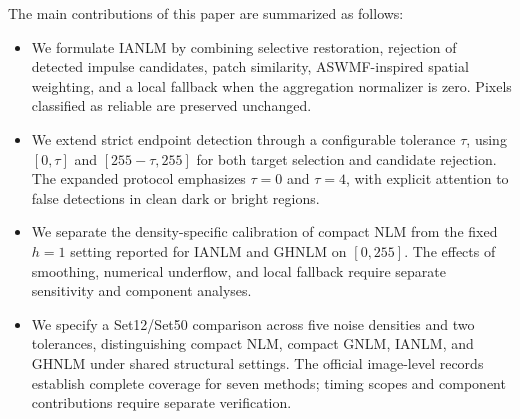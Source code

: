 \documentclass[pdflatex,iicol,sn-mathphys-num]{sn-jnl}
\newif\ifshowportuguese
\newcommand{\pt}[1]{\ifshowportuguese\par\begingroup\small\color{blue!55!black}\noindent\textbf{PT: }#1\par\endgroup\fi}
\begin{document}
The main contributions of this paper are summarized as follows:
\pt{As principais contribuições deste artigo são resumidas a seguir:}
\begin{itemize}
    \item We formulate IANLM by combining selective restoration, rejection of detected impulse candidates, patch similarity, ASWMF-inspired spatial weighting, and a local fallback when the aggregation normalizer is zero. Pixels classified as reliable are preserved unchanged.
\pt{Formulamos o IANLM combinando restauração seletiva, rejeição de candidatos detectados como impulsos, similaridade entre patches, ponderação espacial inspirada no ASWMF e fallback local quando o normalizador da agregação é nulo. Pixels classificados como confiáveis são preservados inalterados.}
    \item We extend strict endpoint detection through a configurable tolerance $\tau$, using $[0,\tau]$ and $[255-\tau,255]$ for both target selection and candidate rejection. The expanded protocol emphasizes $\tau=0$ and $\tau=4$, with explicit attention to false detections in clean dark or bright regions.
\pt{Estendemos a detecção estrita nos extremos por meio de uma tolerância configurável $\tau$, usando $[0,\tau]$ e $[255-\tau,255]$ tanto para selecionar alvos quanto para rejeitar candidatos. O protocolo ampliado enfatiza $\tau=0$ e $\tau=4$, com atenção explícita às falsas detecções em regiões limpas escuras ou claras.}
    \item We separate the density-specific calibration of compact NLM from the fixed $h=1$ setting reported for IANLM and GHNLM on $[0,255]$. The effects of smoothing, numerical underflow, and local fallback require separate sensitivity and component analyses.
\pt{Separamos a calibração do NLM compacto específica por densidade da configuração fixa $h=1$ informada para IANLM e GHNLM em $[0,255]$. Os efeitos da suavização, do underflow numérico e do fallback local exigem análises separadas de sensibilidade e componentes.}
    \item We specify a Set12/Set50 comparison across five noise densities and two tolerances, distinguishing compact NLM, compact GNLM, IANLM, and GHNLM under shared structural settings. The official image-level records establish complete coverage for seven methods; timing scopes and component contributions require separate verification.
\pt{Especificamos uma comparação Set12/Set50 em cinco densidades de ruído e duas tolerâncias, distinguindo NLM compacto, GNLM compacto, IANLM e GHNLM sob configurações estruturais comuns. Os registros oficiais por imagem estabelecem cobertura completa para sete métodos; os escopos de tempo e as contribuições dos componentes exigem verificação separada.}
\end{itemize}
\end{document}
